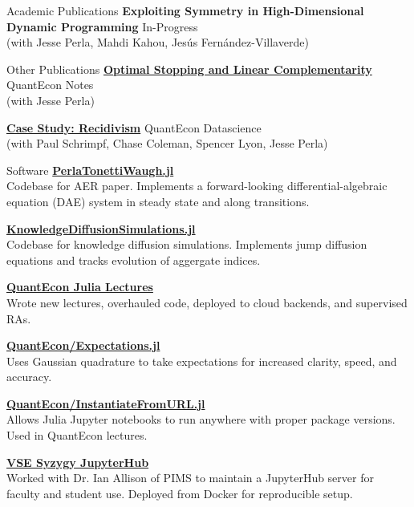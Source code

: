 \documentclass{resume} %
\begin{document}
\begin{rSection}{Academic Publications}
    {\bf Exploiting Symmetry in High-Dimensional Dynamic Programming} \hfill {In-Progress} 
    \\ (with Jesse Perla, Mahdi Kahou, Jes\'{u}s Fern\'{a}ndez-Villaverde)    
\end{rSection}

\begin{rSection}{Other Publications}
    {\bf \href{https://notes.quantecon.org/submission/5c832d2be7b4c5000f4c8e48}{Optimal Stopping and Linear Complementarity}} \hfill {QuantEcon Notes}
    \\ (with Jesse Perla)

    {\bf \href{https://datascience.quantecon.org/applications/recidivism.html}{Case Study: Recidivism}} \hfill {QuantEcon Datascience}
    \\ (with Paul Schrimpf, Chase Coleman, Spencer Lyon, Jesse Perla)
\end{rSection}

\begin{rSection}{Software}
    {\bf \href{https://github.com/jlperla/PerlaTonettiWaugh.jl}{PerlaTonettiWaugh.jl}}
    \\ Codebase for AER paper. Implements a forward-looking differential-algebraic equation (DAE) system in steady state and along transitions.  

    {\bf \href{https://github.com/jlperla/KnowledgeDiffusionSimulations.jl
    }{KnowledgeDiffusionSimulations.jl}}
    \\ Codebase for knowledge diffusion simulations. Implements jump diffusion equations and tracks evolution of aggergate indices.

    {\bf \href{https://julia.quantecon.org}{QuantEcon Julia Lectures}}
    \\ Wrote new lectures, overhauled code, deployed to cloud backends, and supervised RAs.

    {\bf \href{https://github.com/quantecon/Expectations.jl}{QuantEcon/Expectations.jl}} 
    \\ Uses Gaussian quadrature to take expectations for increased clarity, speed, and accuracy. 

    {\bf \href{https://github.com/quantecon/InstantiateFromURL.jl}{QuantEcon/InstantiateFromURL.jl}} 
    \\ Allows Julia Jupyter notebooks to run anywhere with proper package versions. Used in QuantEcon lectures.

    {\bf \href{https://vse.syzygy.ca}{VSE Syzygy JupyterHub}} %
    \\ Worked with Dr. Ian Allison of PIMS to maintain a JupyterHub server for faculty and student use. Deployed from Docker for reproducible setup.
\end{rSection}
\end{document}
